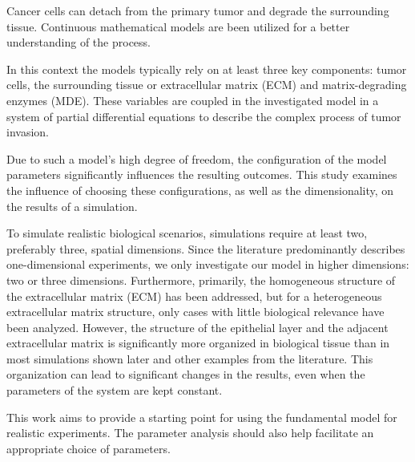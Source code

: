 Cancer cells can detach from the primary tumor and degrade the surrounding tissue. 
Continuous mathematical models are been utilized for a better understanding of the process.

In this context the models typically rely on at least three key components: tumor cells, the surrounding tissue or extracellular matrix (ECM) and matrix-degrading enzymes (MDE). These variables are coupled in the investigated model in a  system of partial differential equations to describe the complex process of tumor invasion.

Due to such a model's high degree of freedom, the configuration of the model parameters significantly influences the resulting outcomes. This study examines the influence of choosing these configurations, as well as the dimensionality, on the results of a simulation.

To simulate realistic biological scenarios, simulations require at least two, preferably three, spatial dimensions. Since the literature predominantly describes one-dimensional experiments, we only investigate our model in higher dimensions: two or three dimensions. Furthermore, primarily, the homogeneous structure of the extracellular matrix (ECM) has been addressed, but for a heterogeneous extracellular matrix structure, only cases with little biological relevance have been analyzed. However, the structure of the epithelial layer and the adjacent extracellular matrix is significantly more organized in biological tissue than in most simulations shown later and other examples from the literature. This organization can lead to significant changes in the results, even when the parameters of the system are kept constant.

This work aims to provide a starting point for using the fundamental model for realistic experiments. The parameter analysis should also help facilitate an appropriate choice of parameters.
